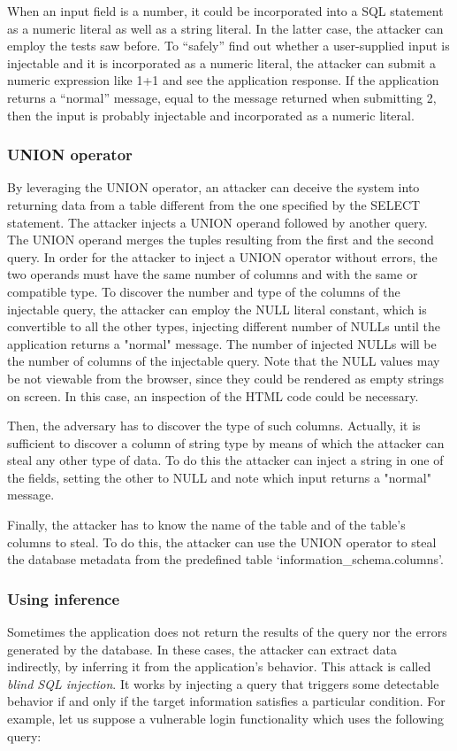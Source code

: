 \documentclass[a4paper,12pt]{article}
\begin{document}
When an input field is a number, it could be incorporated into a SQL statement as a numeric literal as well as a string literal. In the latter case, the attacker can employ the tests saw before. To “safely” find out whether a user-supplied input is injectable and it is incorporated as a numeric literal, the attacker can submit a numeric expression like 1+1 and see the application response. If the application returns a “normal” message, equal to the message returned when submitting 2, then the input is probably injectable and incorporated as a numeric literal.

\subsubsection{UNION operator}
By leveraging the UNION operator, an attacker can deceive the system into returning data from a table different from the one specified by the SELECT statement. The attacker injects a UNION operand followed by another query. The UNION operand merges the tuples resulting from the first and the second query.
In order for the attacker to inject a UNION operator without errors, the two operands must have the same number of columns and with the same or compatible type. To discover the number and type of the columns of the injectable query, the attacker can employ the NULL literal constant, which is convertible to all the other types, injecting different number of NULLs until the application returns a "normal" message. The number of injected NULLs will be the number of columns of the injectable query. Note that the NULL values may be not viewable from the browser, since they could be rendered as empty strings on screen. In this case, an inspection of the HTML code could be necessary.

Then, the adversary has to discover the type of such columns. Actually, it is sufficient to discover a column of string type by means of which the attacker can steal any other type of data. To do this the attacker can inject a string in one of the fields, setting the other to NULL and note which input returns a "normal" message.

Finally, the attacker has to know the name of the table and of the table’s columns to steal. To do this, the attacker can use the UNION operator to steal the database metadata from the predefined table ‘information\_schema.columns’.

\subsubsection{Using inference}
Sometimes the application does not return the results of the query nor the errors generated by the database. In these cases, the attacker can extract data indirectly, by inferring it from the application’s behavior. This attack is called \textit{blind SQL injection}. It works by injecting a query that triggers some detectable behavior if and only if the target information satisfies a particular condition. For example, let us suppose a vulnerable login functionality which uses the following query:
\end{document}
